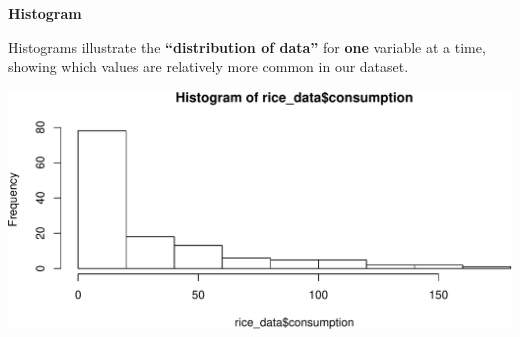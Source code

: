 \documentclass[ignorenonframetext,]{beamer}
\newenvironment{Shaded}{\begin{snugshade}}{\end{snugshade}}
\newcommand{\KeywordTok}[1]{\textcolor[rgb]{0.13,0.29,0.53}{\textbf{#1}}}
\newcommand{\NormalTok}[1]{#1}
\newcommand{\OperatorTok}[1]{\textcolor[rgb]{0.81,0.36,0.00}{\textbf{#1}}}
\newcommand{\StringTok}[1]{\textcolor[rgb]{0.31,0.60,0.02}{#1}}
\begin{document}
\begin{frame}[fragile]{}
\protect\hypertarget{section-11}{}

\textbf{\large Histogram}

Histograms illustrate the \textbf{``distribution of data''} for
\textbf{one} variable at a time, showing which values are relatively
more common in our dataset.

\vspace{1ex}\scriptsize

\begin{Shaded}
\end{Shaded}

\includegraphics{lecture-03_files/figure-beamer/unnamed-chunk-5-1.pdf}

\end{frame}
\end{document}
